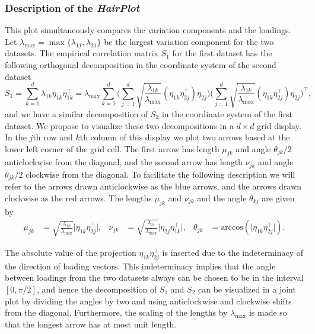 \documentclass[titlepage,11pt,twoside]{article}
\newcommand{\acos}{\text{arccos}}
\begin{document}
\subsubsection{Description of the \emph{HairPlot}} 
This plot simultaneously compares the variation components and the loadings. Let $\lambda_{\max} = \max\{ \lambda_{11}, \lambda_{21} \}$ be the largest variation component for the two datasets. The empirical correlation matrix $S_1$ for the first dataset has the following orthogonal decomposition in the coordinate system of the second dataset
\begin{equation*}
S_1 = \sum_{k=1}^d \lambda_{1k} \eta_{1k} \eta_{1k}^\top
= \lambda_{\max} \sum_{k=1}^d
\Bigg( \sum_{j=1}^d \sqrt{\frac{\lambda_{1k}}{\lambda_{\max}}} (\eta_{1k} \eta_{2j}^\top) \eta_{2j} \Bigg)
\Bigg( \sum_{j=1}^d \sqrt{\frac{\lambda_{1k}}{\lambda_{\max}}} (\eta_{1k} \eta_{2j}^\top) \eta_{2j} \Bigg)^\top,
\end{equation*}
and we have a similar decomposition of $S_2$ in the coordinate system of the first dataset. We propose to visualize these two decompositions in a $d \times d$ grid display. In the $j$th row and $k$th column of this display we plot two arrows based at the lower left corner of the grid cell. The first arrow has length $\mu_{jk}$ and angle $\theta_{jk}/2$ anticlockwise from the diagonal, and the second arrow has length $\nu_{jk}$ and angle $\theta_{jk}/2$ clockwise from the diagonal. To facilitate the following description we will refer to the arrows drawn anticlockwise as the blue arrows, and the arrows drawn clockwise as the red arrows. The lengths $\mu_{jk}$ and $\nu_{jk}$ and the angle $\theta_{kj}$ are given by
\begin{align*}
\mu_{jk} &= \sqrt{\frac{\lambda_{1k}}{\lambda_{\max}}} \lvert \eta_{1k} \eta_{2j}^\top \rvert, &
\nu_{jk} &= \sqrt{\frac{\lambda_{2j}}{\lambda_{\max}}} \lvert \eta_{2j} \eta_{1k}^\top \rvert, &
\theta_{jk} &= \acos(\lvert \eta_{1k} \eta_{2j}^\top \rvert).
\end{align*}

The absolute value of the projection $\eta_{1k} \eta_{2j}^\top$ is inserted due to the indeterminacy of the direction of loading vectors. This indeterminacy implies that the angle between loadings from the two datasets always can be chosen to be in the interval $[0,\pi/2]$, and hence the decomposition of $S_1$ and $S_2$ can be visualized in a joint plot by dividing the angles by two and using anticlockwise and clockwise shifts from the diagonal. Furthermore, the scaling of the lengths by $\lambda_{\max}$ is made so that the longest arrow has at most unit length.
\end{document}
